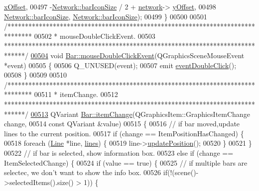\begin{DoxyCode}
      \hyperlink{class_network_a9f5c70be28a45320802bd0ac3947d114}{xOffset},
00497                 -\hyperlink{group___graphics_gaa334bbc93b3fde219840e95e23198b53}{Network::barIconSize} / 2 + \hyperlink{class_bar_a80025f13884750add58cc61b318357ff}{network}->
      \hyperlink{class_network_a771b16f7eb4459d0ca7141c048b1ab59}{yOffset},
00498                 \hyperlink{group___graphics_gaa334bbc93b3fde219840e95e23198b53}{Network::barIconSize}, \hyperlink{group___graphics_gaa334bbc93b3fde219840e95e23198b53}{Network::barIconSize});
00499 \}
00500 
00501 \textcolor{comment}{/*******************************************************************************}
00502 \textcolor{comment}{ * mouseDoubleClickEvent.}
00503 \textcolor{comment}{ ******************************************************************************/}
\hypertarget{bar_8cpp_source_l00504}{}\hyperlink{group___models_ga1945e7b4401fa9ad7475274d9fb12a72}{00504} \textcolor{keywordtype}{void} \hyperlink{group___models_ga1945e7b4401fa9ad7475274d9fb12a72}{Bar::mouseDoubleClickEvent}(QGraphicsSceneMouseEvent *event)
00505 \{
00506   Q\_UNUSED(event);
00507   emit \hyperlink{class_bar_a66bcbd19582dddee7e171ae5a4475f4b}{eventDoubleClick}();
00508 \}
00509 
00510 \textcolor{comment}{/*******************************************************************************}
00511 \textcolor{comment}{ * itemChange.}
00512 \textcolor{comment}{ ******************************************************************************/}
\hypertarget{bar_8cpp_source_l00513}{}\hyperlink{group___models_gad97a82d618ee0c51a9a36e44339c69e6}{00513} QVariant \hyperlink{group___models_gad97a82d618ee0c51a9a36e44339c69e6}{Bar::itemChange}(QGraphicsItem::GraphicsItemChange change,
00514                          \textcolor{keyword}{const} QVariant &value)
00515 \{
00516   \textcolor{comment}{// if bar moved,update lines to the current position.}
00517   \textcolor{keywordflow}{if} (change == ItemPositionHasChanged) \{
00518     \textcolor{keywordflow}{foreach} (\hyperlink{class_line}{Line} *line, \hyperlink{class_bar_a23b6d4319352ef0e77ad66aade4e0209}{lines}) \{
00519       line->\hyperlink{group___models_ga8fdb12651d4bc592616d241386b066b3}{updatePosition}();
00520     \}
00521   \}
00522   \textcolor{comment}{// if bar is selected, show information box.}
00523   \textcolor{keywordflow}{else} \textcolor{keywordflow}{if} (change == ItemSelectedChange) \{
00524     \textcolor{keywordflow}{if} (value == \textcolor{keyword}{true}) \{
00525       \textcolor{comment}{// if multiple bars are selectec, we don't want to show the info box.}
00526       \textcolor{keywordflow}{if}(!(scene()->selectedItems().size() > 1)) \{

\end{DoxyCode}
